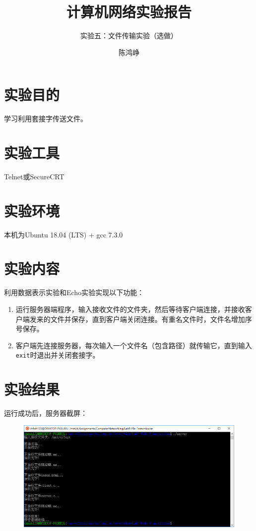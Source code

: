 \documentclass[logo,reportComp]{thesis}
\title{计算机网络实验报告}
\subtitle{实验五：文件传输实验（选做）}
\author{陈鸿峥}
\begin{document}
\maketitle

\section{实验目的}
学习利用套接字传送文件。

\section{实验工具}
Telnet或SecureCRT

\section{实验环境}
本机为Ubuntu 18.04 (LTS) + gcc 7.3.0

\section{实验内容}
利用数据表示实验和Echo实验实现以下功能：
\begin{enumerate}
    \item 运行服务器端程序，输入接收文件的文件夹，然后等待客户端连接，并接收客户端发来的文件并保存，直到客户端关闭连接。有重名文件时，文件名增加序号保存。
    \item 客户端先连接服务器，每次输入一个文件名（包含路径）就传输它，直到输入\verb'exit'时退出并关闭套接字。
\end{enumerate}

\section{实验结果}
运行成功后，服务器截屏：
\begin{figure}[H]
\centering
\includegraphics[width=0.8\linewidth]{fig/server.PNG}
\end{figure}
\end{document}
